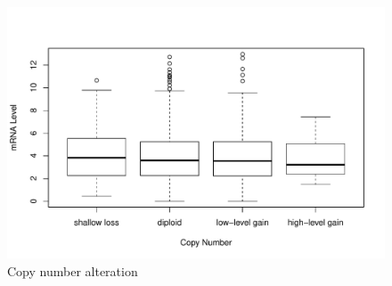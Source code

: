 \begin{figure}[h!]
    \centering
    \includegraphics[scale=0.75]{figures/cnv.pdf}
    \caption{Copy number alteration \cite{Ciriello2015, Goldman2018}}
    \label{cnv}
\end{figure} 